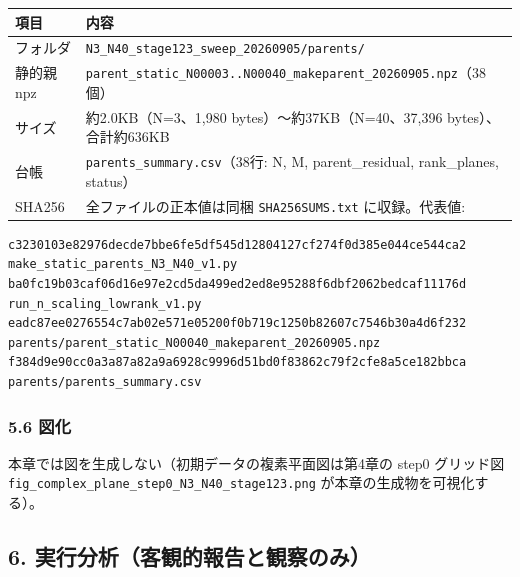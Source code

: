 \documentclass[
  a4paper,
]{ltjsarticle}
\newcounter{none} %
\begin{document}
{\def\LTcaptype{none} %
\begin{longtable}[]{@{}
  >{\raggedright\arraybackslash}p{}
  >{\raggedright\arraybackslash}p{}@{}}
\toprule\noalign{}
\begin{minipage}[b]{\linewidth}\raggedright
項目
\end{minipage} & \begin{minipage}[b]{\linewidth}\raggedright
内容
\end{minipage} \\
\midrule\noalign{}
\endhead
\bottomrule\noalign{}
\endlastfoot
フォルダ & \texttt{N3\_N40\_stage123\_sweep\_20260905/parents/} \\
静的親 npz &
\texttt{parent\_static\_N00003..N00040\_makeparent\_20260905.npz}（38個） \\
サイズ & 約2.0KB（N=3、1,980 bytes）〜約37KB（N=40、37,396
bytes）、合計約636KB \\
台帳 & \texttt{parents\_summary.csv}（38行: N, M, parent\_residual,
rank\_planes, status） \\
SHA256 & 全ファイルの正本値は同梱 \texttt{SHA256SUMS.txt}
に収録。代表値: \\
\end{longtable}
}

\begin{verbatim}
c3230103e82976decde7bbe6fe5df545d12804127cf274f0d385e044ce544ca2  make_static_parents_N3_N40_v1.py
ba0fc19b03caf06d16e97e2cd5da499ed2ed8e95288f6dbf2062bedcaf11176d  run_n_scaling_lowrank_v1.py
eadc87ee0276554c7ab02e571e05200f0b719c1250b82607c7546b30a4d6f232  parents/parent_static_N00040_makeparent_20260905.npz
f384d9e90cc0a3a87a82a9a6928c9996d51bd0f83862c79f2cfe8a5ce182bbca  parents/parents_summary.csv
\end{verbatim}

\subsubsection{5.6 図化}\label{ux56f3ux5316}

本章では図を生成しない（初期データの複素平面図は第4章の step0 グリッド図
\texttt{fig\_complex\_plane\_step0\_N3\_N40\_stage123.png}
が本章の生成物を可視化する）。

\subsection{6.
実行分析（客観的報告と観察のみ）}\label{ux5b9fux884cux5206ux6790ux5ba2ux89b3ux7684ux5831ux544aux3068ux89b3ux5bdfux306eux307f}
\end{document}
